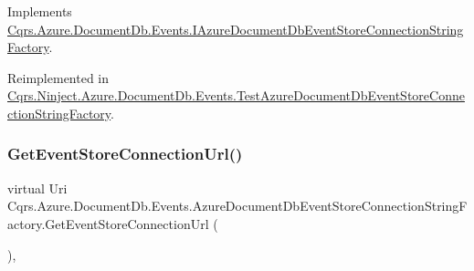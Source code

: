 Implements \hyperlink{interfaceCqrs_1_1Azure_1_1DocumentDb_1_1Events_1_1IAzureDocumentDbEventStoreConnectionStringFactory_a826c95e8dab31be9ef97cf3bea92d95d_a826c95e8dab31be9ef97cf3bea92d95d}{Cqrs.\+Azure.\+Document\+Db.\+Events.\+I\+Azure\+Document\+Db\+Event\+Store\+Connection\+String\+Factory}.



Reimplemented in \hyperlink{classCqrs_1_1Ninject_1_1Azure_1_1DocumentDb_1_1Events_1_1TestAzureDocumentDbEventStoreConnectionStringFactory_a85b4e6cd45d285be6de5db19148118b9_a85b4e6cd45d285be6de5db19148118b9}{Cqrs.\+Ninject.\+Azure.\+Document\+Db.\+Events.\+Test\+Azure\+Document\+Db\+Event\+Store\+Connection\+String\+Factory}.

\mbox{\label{classCqrs_1_1Azure_1_1DocumentDb_1_1Events_1_1AzureDocumentDbEventStoreConnectionStringFactory_a53d282392000624128304c6477a2a466_a53d282392000624128304c6477a2a466}} 
\subsubsection{\texorpdfstring{Get\+Event\+Store\+Connection\+Url()}{GetEventStoreConnectionUrl()}}
{\footnotesize\ttfamily virtual Uri Cqrs.\+Azure.\+Document\+Db.\+Events.\+Azure\+Document\+Db\+Event\+Store\+Connection\+String\+Factory.\+Get\+Event\+Store\+Connection\+Url (\begin{DoxyParamCaption}{ }\end{DoxyParamCaption})\hspace{0.3cm}{\ttfamily [protected]}, {\ttfamily [virtual]}}



